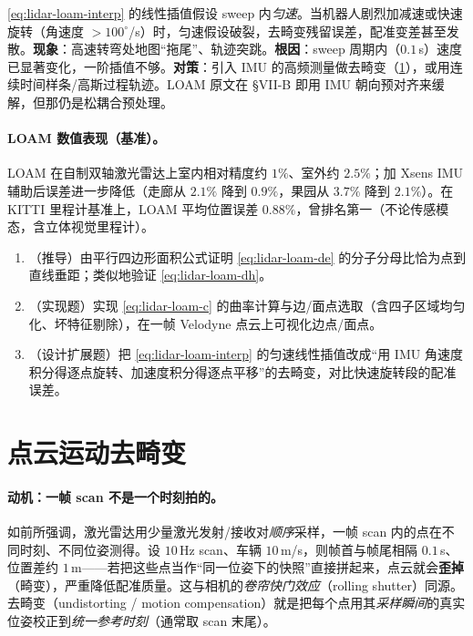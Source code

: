\begin{pitfall}
\cref{eq:lidar-loam-interp} 的线性插值假设 sweep 内\emph{匀速}。当机器人剧烈加减速或快速旋转（角速度 $>100^\circ$/s）时，匀速假设破裂，去畸变残留误差，配准变差甚至发散。\textbf{现象}：高速转弯处地图“拖尾”、轨迹突跳。\textbf{根因}：sweep 周期内（$0.1$\,s）速度已显著变化，一阶插值不够。\textbf{对策}：引入 IMU 的高频测量做去畸变（\cref{sec:lidar-deskew}），或用连续时间样条/高斯过程轨迹。LOAM 原文在 §VII-B 即用 IMU 朝向预对齐来缓解，但那仍是松耦合预处理。
\end{pitfall}

\paragraph{LOAM 数值表现（基准）。}
LOAM 在自制双轴激光雷达上室内相对精度约 $1\%$、室外约 $2.5\%$\cite{zhang2014loam}；加 Xsens IMU 辅助后误差进一步降低（走廊从 $2.1\%$ 降到 $0.9\%$，果园从 $3.7\%$ 降到 $2.1\%$）。在 KITTI 里程计基准上，LOAM 平均位置误差 $0.88\%$，曾排名第一（不论传感模态，含立体视觉里程计）。

\begin{practice}
\begin{enumerate}
  \item （推导）由平行四边形面积公式证明 \cref{eq:lidar-loam-de} 的分子分母比恰为点到直线垂距；类似地验证 \cref{eq:lidar-loam-dh}。
  \item （实现题）实现 \cref{eq:lidar-loam-c} 的曲率计算与边/面点选取（含四子区域均匀化、坏特征剔除），在一帧 Velodyne 点云上可视化边点/面点。
  \item （设计扩展题）把 \cref{eq:lidar-loam-interp} 的匀速线性插值改成“用 IMU 角速度积分得逐点旋转、加速度积分得逐点平移”的去畸变，对比快速旋转段的配准误差。
\end{enumerate}
\end{practice}

\section{点云运动去畸变}
\label{sec:lidar-deskew}

\paragraph{动机：一帧 scan 不是一个时刻拍的。}
如前所强调，激光雷达用少量激光发射/接收对\emph{顺序}采样，一帧 scan 内的点在不同时刻、不同位姿测得。设 $10$\,Hz scan、车辆 $10$\,m/s，则帧首与帧尾相隔 $0.1$\,s、位置差约 $1$\,m——若把这些点当作“同一位姿下的快照”直接拼起来，点云就会\textbf{歪掉}（畸变），严重降低配准质量\cite{carlone2026handbook}。这与相机的\emph{卷帘快门效应}（rolling shutter）同源。去畸变（undistorting / motion compensation）就是把每个点用其\emph{采样瞬间}的真实位姿校正到\emph{统一参考时刻}（通常取 scan 末尾）。

